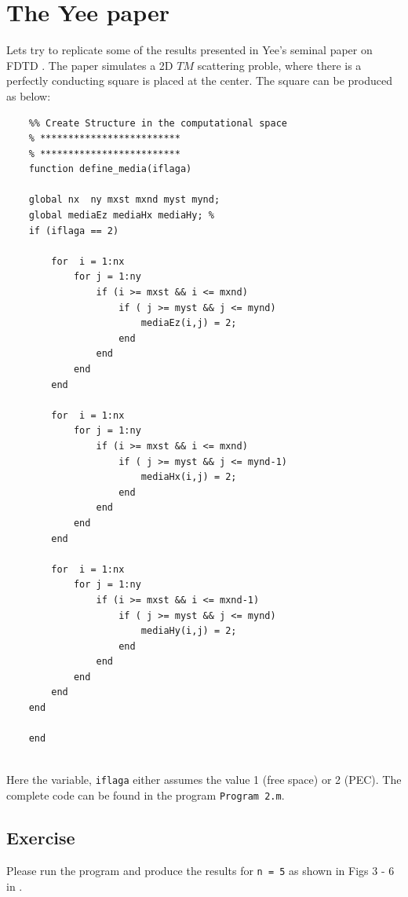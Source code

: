 \documentclass[12pt]{article}
\begin{document}
\section{The Yee paper}

Lets try to replicate some of the results presented in Yee's seminal paper on FDTD \cite{kane_yee_numerical_1966}. The paper simulates a 2D $TM$ scattering proble, where there is a perfectly conducting square is placed at the center. The square can be produced as below:

\begin{mdframed}[backgroundcolor=gray!20]
  \scriptsize
  \begin{verbatim}
    %% Create Structure in the computational space
    % *************************
    % *************************
    function define_media(iflaga)
    
    global nx  ny mxst mxnd myst mynd;
    global mediaEz mediaHx mediaHy; %
    if (iflaga == 2)
        
        for  i = 1:nx
            for j = 1:ny
                if (i >= mxst && i <= mxnd)
                    if ( j >= myst && j <= mynd)
                        mediaEz(i,j) = 2;
                    end
                end
            end
        end
        
        for  i = 1:nx
            for j = 1:ny
                if (i >= mxst && i <= mxnd)
                    if ( j >= myst && j <= mynd-1)
                        mediaHx(i,j) = 2;
                    end
                end
            end
        end
        
        for  i = 1:nx
            for j = 1:ny
                if (i >= mxst && i <= mxnd-1)
                    if ( j >= myst && j <= mynd)
                        mediaHy(i,j) = 2;
                    end
                end
            end
        end
    end
    
    end
    
  \end{verbatim}
\end{mdframed}

Here the variable, \texttt{iflaga} either assumes the value 1 (free space) or 2 (PEC). The complete code can be found in the program \texttt{Program 2.m}. 


\subsection*{Exercise}

\begin{mdframed}[backgroundcolor=blue!20]

  Please run the program and produce the results for \texttt{n = 5} as shown in Figs 3 - 6 in \cite{kane_yee_numerical_1966}.
\end{mdframed}
\end{document}
